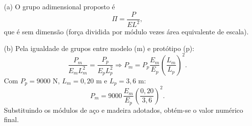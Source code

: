(a) O grupo adimensional proposto é
\[
\Pi = \frac{P}{E L^2},
\]
que é sem dimensão (força dividida por módulo vezes área equivalente de escala).

(b) Pela igualdade de grupos entre modelo (m) e protótipo (p):
\[
\frac{P_m}{E_m L_m^2}=\frac{P_p}{E_p L_p^2}
\Rightarrow
P_m=P_p\frac{E_m}{E_p}\left(\frac{L_m}{L_p}\right)^2.
\]
Com $P_p=9000$ N, $L_m=0{,}20$ m e $L_p=3{,}6$ m:
\[
P_m=9000\,\frac{E_m}{E_p}\left(\frac{0{,}20}{3{,}6}\right)^2.
\]
Substituindo os módulos de aço e madeira adotados, obtém-se o valor numérico final.

